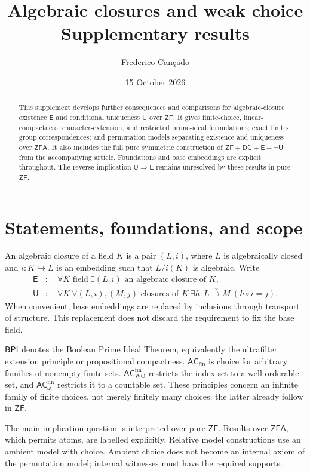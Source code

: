 \documentclass[11pt,a4paper]{article}
\title{Algebraic closures and weak choice\\\large Supplementary results}
\author{Frederico Can\c{c}ado}
\date{15 October 2026}
\theoremstyle{definition}\newtheorem{definition}[theorem]{Definition}
\theoremstyle{remark}\newtheorem{remark}[theorem]{Remark}
\newcommand{\ZF}{\mathsf{ZF}}\newcommand{\ZFA}{\mathsf{ZFA}}
\newcommand{\E}{\mathsf E}\newcommand{\U}{\mathsf U}
\newcommand{\ACfin}{\mathsf{AC}_{\mathrm{fin}}}
\newcommand{\ACwfin}{\mathsf{AC}^{\mathrm{fin}}_{\omega}}
\newcommand{\ACWfin}{\mathsf{AC}^{\mathrm{fin}}_{\mathrm{WO}}}
\begin{document}
\maketitle
\begin{abstract}
This supplement develops further consequences and comparisons for algebraic-closure existence $\E$ and conditional uniqueness $\U$ over $\ZF$. It gives finite-choice, linear-compactness, character-extension, and restricted prime-ideal formulations; exact finite-group correspondences; and permutation models separating existence and uniqueness over $\ZFA$. It also includes the full pure symmetric construction of $\ZF+\mathsf{DC}+\E+\neg\U$ from the accompanying article. Foundations and base embeddings are explicit throughout. The reverse implication $\U\Rightarrow\E$ remains unresolved by these results in pure $\ZF$.
\end{abstract}
\begingroup
\small\setlength{\parskip}{0pt}
\makeatletter
\renewcommand*\l@section{\@dottedtocline{1}{0em}{2em}}
\makeatother
\setcounter{tocdepth}{1}
\tableofcontents
\endgroup
\newpage

\section{Statements, foundations, and scope}
An algebraic closure of a field $K$ is a pair $(L,i)$, where $L$ is algebraically closed and $i:K\hookrightarrow L$ is an embedding such that $L/i(K)$ is algebraic. Write
\begin{align*}
\E&:\quad \forall K\text{ field}\ \exists(L,i)\text{ an algebraic closure of }K,\\
\U&:\quad \forall K\ \forall(L,i),(M,j)\text{ closures of }K\ 
\exists h:L\xrightarrow{\sim}M\ (h\circ i=j).
\end{align*}
When convenient, base embeddings are replaced by inclusions through transport of structure. This replacement does not discard the requirement to fix the base field.

$\mathsf{BPI}$ denotes the Boolean Prime Ideal Theorem, equivalently the ultrafilter extension principle or propositional compactness. $\ACfin$ is choice for arbitrary families of nonempty finite sets. $\ACWfin$ restricts the index set to a well-orderable set, and $\ACwfin$ restricts it to a countable set. These principles concern an infinite family of finite choices, not merely finitely many choices; the latter already follow in $\ZF$.

The main implication question is interpreted over pure $\ZF$. Results over $\ZFA$, which permits atoms, are labelled explicitly. Relative model constructions use an ambient model with choice. Ambient choice does not become an internal axiom of the permutation model; internal witnesses must have the required supports.
\end{document}
